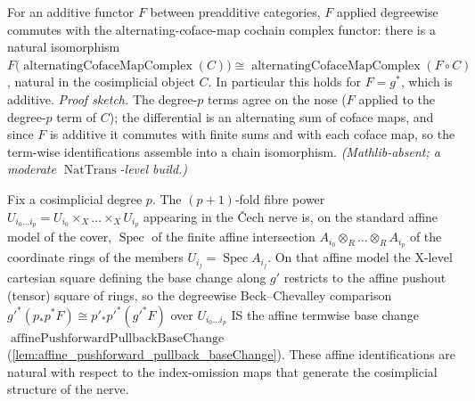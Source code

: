 \begin{lemma}
  \label{lem:pullback_commutes_alternatingCofaceMapComplex}
  For an additive functor \(F\) between preadditive categories, \(F\) applied
  degreewise commutes with the alternating-coface-map cochain complex functor: there is
  a natural isomorphism
  \(F\bigl(\operatorname{alternatingCofaceMapComplex}(C)\bigr) \cong
  \operatorname{alternatingCofaceMapComplex}(F \circ C)\), natural in the cosimplicial
  object \(C\). In particular this holds for \(F = g^*\), which is additive.
  \emph{Proof sketch.} The degree-\(p\) terms agree on the nose (\(F\) applied to the
  degree-\(p\) term of \(C\)); the differential is an alternating sum of coface maps,
  and since \(F\) is additive it commutes with finite sums and with each coface map, so
  the term-wise identifications assemble into a chain isomorphism. \emph{(Mathlib-absent;
  a moderate \(\operatorname{NatTrans}\)-level build.)}
\end{lemma}


\begin{lemma}

  \label{lem:cech_degree_affine_baseChange}
  Fix a cosimplicial degree \(p\). The \((p+1)\)-fold fibre power
  \(U_{i_0\dots i_p} = U_{i_0} \times_X \dots \times_X U_{i_p}\) appearing in the
  {\v C}ech nerve is, on the standard affine model of the cover, \(\operatorname{Spec}\)
  of the finite affine intersection \(A_{i_0} \otimes_R \dots \otimes_R A_{i_p}\) of the
  coordinate rings of the members \(U_{i_j} = \operatorname{Spec} A_{i_j}\). On that
  affine model the X-level cartesian square defining the base change along \(g'\)
  restricts to the affine pushout (tensor) square of rings, so the degreewise
  Beck--Chevalley comparison
  \(g'^*(p_* p^* F) \cong p'_* p'^*(g'^* F)\) over \(U_{i_0\dots i_p}\) IS the affine
  termwise base change \(\operatorname{affinePushforwardPullbackBaseChange}\)
  (\cref{lem:affine_pushforward_pullback_baseChange}). These affine identifications are
  natural with respect to the index-omission maps that generate the cosimplicial
  structure of the nerve.
\end{lemma}

